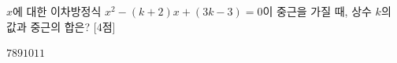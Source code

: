 $x$에 대한 이차방정식 $x^2-(k+2)x+(3k-3)=0$이 중근을 가질 때, 상수 $k$의 값과 중근의 합은? \mbox{[4점]}
\begin{choices32}{$7$}{$8$}{$9$}{$10$}{$11$}\end{choices32}
